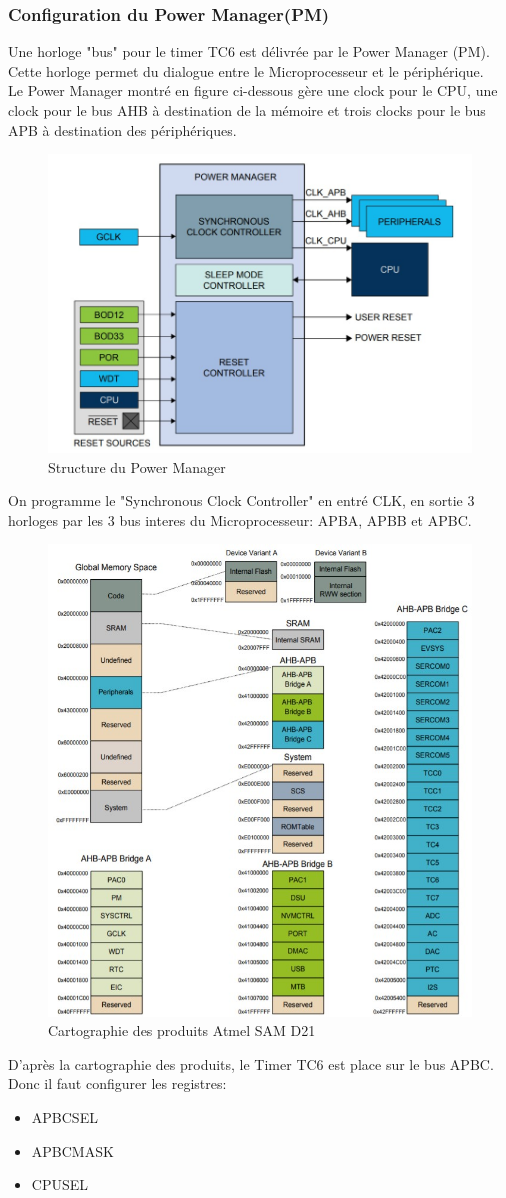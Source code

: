 \documentclass[a4paper]{article}
\begin{document}
	\subsubsection{Configuration du Power Manager(PM)} 
	Une horloge "bus" pour le timer TC6 est délivrée par le Power Manager (PM). Cette horloge permet du dialogue entre le Microprocesseur et le périphérique.\\
	Le Power Manager montré en figure ci-dessous gère une clock pour le CPU, une clock pour le bus AHB à destination de la mémoire et trois clocks pour le bus APB à destination des périphériques.\\
	\begin{figure}[H]
		\centering
		\includegraphics[width=0.6\linewidth]{PM_bloc.jpg}
		\caption{Structure du Power Manager}
	\end{figure}
	On programme le "Synchronous Clock Controller" en entré CLK, en sortie 3 horloges par les 3 bus interes du Microprocesseur: APBA, APBB et APBC.\\
	\begin{figure}[H]
		\centering
		\includegraphics[width=0.8\linewidth]{product mapping_SAMD21.jpg}
		\caption{Cartographie des produits Atmel SAM D21}
	\end{figure}
	D'après la cartographie des produits, le Timer TC6 est place sur le bus APBC. Donc il faut configurer les registres:
	\begin{itemize}
		\item {APBCSEL}
		\item {APBCMASK}
		\item {CPUSEL}
	\end{itemize}
\end{document}
